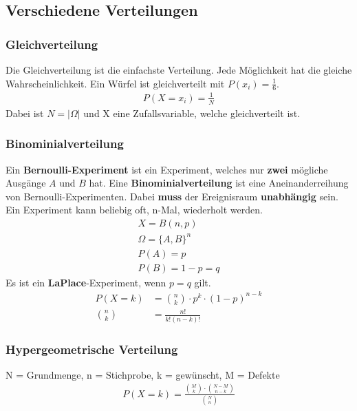 \documentclass[a4paper, landscape, 10pt]{article}
\begin{document}
\begin{multicols}{4}
\begin{small}
	    \subsection{Verschiedene Verteilungen}
		   \subsubsection{Gleichverteilung}	
			   Die Gleichverteilung ist die einfachste Verteilung. Jede Möglichkeit hat die gleiche Wahrscheinlichkeit. Ein Würfel ist gleichverteilt mit $P(x_i) = \frac{1}{6}$.\\
			   \begin{align*}
			   P(X = x_i) = \frac{1}{N}
			   \end{align*}
			   Dabei ist $N = |\Omega|$ und X eine Zufallsvariable, welche gleichverteilt ist.
	    	\subsubsection{Binominialverteilung}
			    Ein \textbf{Bernoulli-Experiment} ist ein Experiment, welches nur \textbf{zwei} mögliche Ausgänge $A$ und $B$ hat. Eine \textbf{Binominialverteilung} ist eine Aneinanderreihung von Bernoulli-Experimenten. Dabei \textbf{muss} der Ereignisraum \textbf{unabhängig} sein. Ein Experiment kann beliebig oft, n-Mal, wiederholt werden.
				    \begin{align*}
				    X = B(n, p)\\
				    \Omega = \{A, B\}^n\\
				    P(A) = p\\
				    P(B) = 1 - p = q
				    \end{align*}
	    		Es ist ein \textbf{LaPlace}-Experiment, wenn $p = q$ gilt.
			    \begin{align*}
			    P(X = k) &= {n \choose k} \cdot p^k \cdot (1-p)^{n-k}\\
			    {n \choose k} &= \frac{n!}{k! (n-k)!}
			    \end{align*}
			
			\subsubsection{Hypergeometrische Verteilung}
			N = Grundmenge, n = Stichprobe, k = gewünscht, M = Defekte\\
			\begin{align*}
			P(X = k) = \frac{{M \choose k} \cdot {N - M \choose n - k}}{{N \choose n}}
			\end{align*}

\end{small}
\end{multicols}
\end{document}
